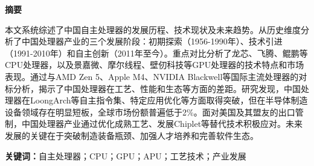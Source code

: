\documentclass[a4paper,colorlinks=true,linkcolor=blue,urlcolor=blue,citecolor=green,bookmarks=true]{article}
\begin{document}
\clearpage
{}
\begin{center}{\songti\bfseries{摘\quad 要}}\end{center}\par\vspace{0.5em}
\begin{cnabstract}
本文系统综述了中国自主处理器的发展历程、技术现状及未来趋势。从历史维度分析了中国处理器产业的三个发展阶段：初期探索（1956-1990年）、技术引进（1991-2010年）和自主创新（2011年至今）。重点对比分析了龙芯、飞腾、鲲鹏等CPU处理器，以及景嘉微、摩尔线程、壁仞科技等GPU处理器的技术特点和市场表现。通过与AMD Zen 5、Apple M4、NVIDIA Blackwell等国际主流处理器的对标分析，揭示了中国处理器在工艺、性能和生态等方面的差距。研究发现，中国处理器在LoongArch等自主指令集、特定应用优化等方面取得突破，但在半导体制造设备领域存在明显短板，全球市场份额普遍低于2\%。面对美国及其盟友的出口管制，中国处理器产业通过优化成熟工艺、发展Chiplet等替代技术积极应对。未来发展的关键在于突破制造装备瓶颈、加强人才培养和完善软件生态。

\vspace{1em}
\noindent\textbf{关键词：}自主处理器；CPU；GPU；APU；工艺技术；产业发展
\end{cnabstract}
\end{document}
